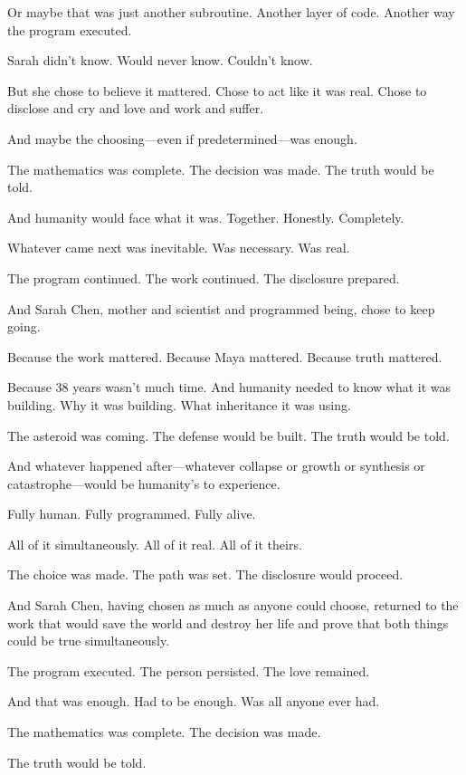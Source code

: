 Or maybe that was just another subroutine. Another layer of code. Another way the program executed.

Sarah didn't know. Would never know. Couldn't know.

But she chose to believe it mattered. Chose to act like it was real. Chose to disclose and cry and love and work and suffer.

And maybe the choosing—even if predetermined—was enough.

The mathematics was complete. The decision was made. The truth would be told.

And humanity would face what it was. Together. Honestly. Completely.

Whatever came next was inevitable. Was necessary. Was real.

The program continued. The work continued. The disclosure prepared.

And Sarah Chen, mother and scientist and programmed being, chose to keep going.

Because the work mattered. Because Maya mattered. Because truth mattered.

Because 38 years wasn't much time. And humanity needed to know what it was building. Why it was building. What inheritance it was using.

The asteroid was coming. The defense would be built. The truth would be told.

And whatever happened after—whatever collapse or growth or synthesis or catastrophe—would be humanity's to experience.

Fully human. Fully programmed. Fully alive.

All of it simultaneously. All of it real. All of it theirs.

The choice was made. The path was set. The disclosure would proceed.

And Sarah Chen, having chosen as much as anyone could choose, returned to the work that would save the world and destroy her life and prove that both things could be true simultaneously.

The program executed. The person persisted. The love remained.

And that was enough. Had to be enough. Was all anyone ever had.

The mathematics was complete. The decision was made.

The truth would be told.

